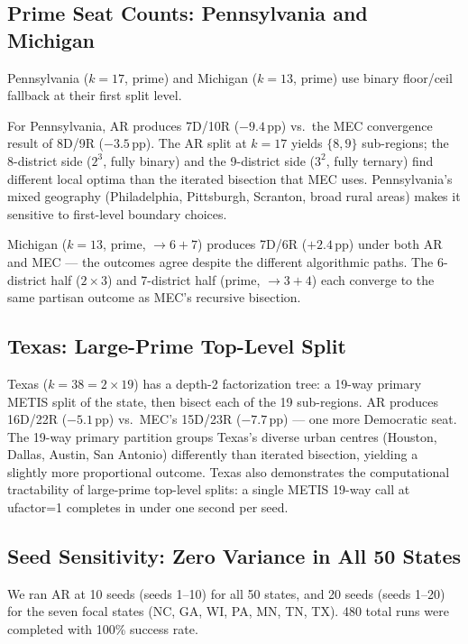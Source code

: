 \subsection{Prime Seat Counts: Pennsylvania and Michigan}
\label{sec:eval:prime}

Pennsylvania ($k = 17$, prime) and Michigan ($k = 13$, prime) use binary
floor/ceil fallback at their first split level.

For Pennsylvania, AR produces 7D/10R ($-9.4$\,pp) vs.\ the MEC convergence
result of 8D/9R ($-3.5$\,pp). The AR split at $k=17$ yields $\{8, 9\}$
sub-regions; the 8-district side ($2^3$, fully binary) and the 9-district side
($3^2$, fully ternary) find different local optima than the iterated bisection
that MEC uses. Pennsylvania's mixed geography (Philadelphia, Pittsburgh, Scranton,
broad rural areas) makes it sensitive to first-level boundary choices.

Michigan ($k = 13$, prime, $\to 6+7$) produces 7D/6R ($+2.4$\,pp) under both
AR and MEC --- the outcomes agree despite the different algorithmic paths. The
6-district half ($2 \times 3$) and 7-district half (prime, $\to 3+4$) each
converge to the same partisan outcome as MEC's recursive bisection.

\subsection{Texas: Large-Prime Top-Level Split}
\label{sec:eval:texas}

Texas ($k = 38 = 2 \times 19$) has a depth-2 factorization tree: a 19-way
primary METIS split of the state, then bisect each of the 19 sub-regions.
AR produces 16D/22R ($-5.1$\,pp) vs.\ MEC's 15D/23R ($-7.7$\,pp) --- one
more Democratic seat. The 19-way primary partition groups Texas's diverse urban
centres (Houston, Dallas, Austin, San Antonio) differently than iterated
bisection, yielding a slightly more proportional outcome. Texas also demonstrates
the computational tractability of large-prime top-level splits: a single METIS
19-way call at ufactor=1 completes in under one second per seed.

\subsection{Seed Sensitivity: Zero Variance in All 50 States}
\label{sec:eval:seeds}

We ran AR at 10 seeds (seeds 1--10) for all 50 states, and 20 seeds
(seeds 1--20) for the seven focal states (NC, GA, WI, PA, MN, TN, TX).
480 total runs were completed with 100\% success rate.

